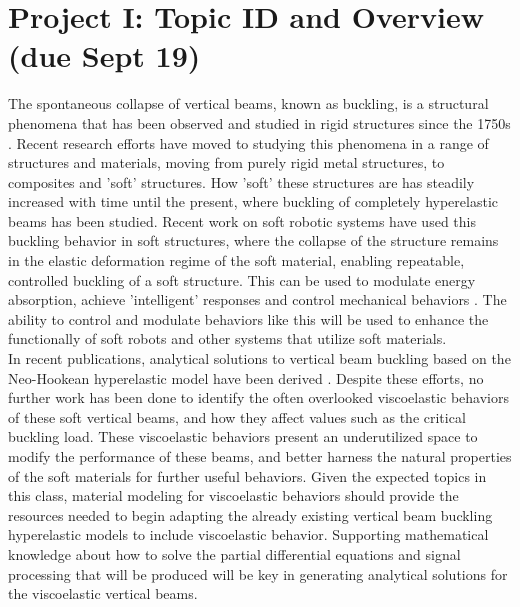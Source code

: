 
\section*{Project I: Topic ID and Overview (due Sept 19)}
The spontaneous collapse of vertical beams, known as buckling, is a structural phenomena that has been observed and studied in rigid structures since the 1750s \cite{TimoshenkoElastStab}. Recent research efforts have moved to studying this phenomena in a range of structures and materials, moving from purely rigid metal structures, to composites and 'soft' structures. How 'soft' these structures are has steadily increased with time until the present, where buckling of completely hyperelastic beams has been studied. Recent work on soft robotic systems have used this buckling behavior in soft structures, where the collapse of the structure remains in the elastic deformation regime of the soft material, enabling repeatable, controlled buckling of a soft structure. This can be used to modulate energy absorption, achieve 'intelligent' responses and control mechanical behaviors \cite{Pal_ExploitingInstab}. The ability to control and modulate behaviors like this will be used to enhance the functionally of soft robots and other systems that utilize soft materials.\\

In recent publications, analytical solutions to vertical beam buckling based on the Neo-Hookean hyperelastic model have been derived \cite{Chen&Jin_Buckling} \cite{Chen&Jin_PostBuckling}. Despite these efforts, no further work has been done to identify the often overlooked viscoelastic behaviors of these soft vertical beams, and how they affect values such as the critical buckling load. These viscoelastic behaviors present an underutilized space to modify the performance of these beams, and better harness the natural properties of the soft materials for further useful behaviors. Given the expected topics in this class, material modeling for viscoelastic behaviors should provide the resources needed to begin adapting the already existing vertical beam buckling hyperelastic models to include viscoelastic behavior. Supporting mathematical knowledge about how to solve the partial differential equations and signal processing that will be produced will be key in generating analytical solutions for the viscoelastic vertical beams.\\

